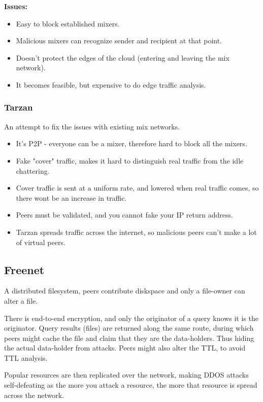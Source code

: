 	\textbf{Issues:}
	\begin{itemize}
		\item Easy to block established mixers.
		\item Malicious mixers can recognize sender and recipient at that point.
		\item Doesn't protect the edges of the cloud (entering and leaving the mix network).
		\item It becomes feasible, but expensive to do edge traffic analysis.
	\end{itemize}
	
	\subsubsection{Tarzan}
	An attempt to fix the issues with existing mix networks.
	
	\begin{itemize}
		\item It's P2P - everyone can be a mixer, therefore hard to block all the mixers.
		\item Fake "cover" traffic, makes it hard to distinguish real traffic from the idle chattering.
		\item Cover traffic is sent at a uniform rate, and lowered when real traffic comes, so there wont be an increase in traffic.
		\item Peers must be validated, and you cannot fake your IP return address.
		\item Tarzan spreads traffic across the internet, so malicious peers can't make a lot of virtual peers.
	\end{itemize}
	
	\subsection{Freenet}
	A distributed filesystem, peers contribute diskspace and only a file-owner can alter a file.
	
	There is end-to-end encryption, and only the originator of a query knows it is the originator. Query results (files) are returned along the same route, during which peers might cache the file and claim that they are the data-holders. Thus hiding the actual data-holder from attacks. Peers might also alter the \gls{TTL}, to avoid \gls{TTL} analysis.
	
	Popular resources  are then replicated over the network, making \gls{DDOS} attacks self-defeating as the more you attack a resource, the more that resource is spread across the network.
	

